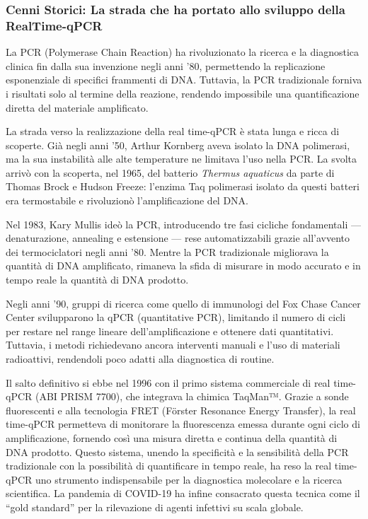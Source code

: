 \begin{noSplitBlock}
\subsubsection{Cenni Storici: La strada che ha portato allo sviluppo della RealTime-qPCR}
\footnotesize{
  La PCR (Polymerase Chain Reaction) ha rivoluzionato la ricerca e la diagnostica clinica fin dalla sua invenzione negli anni ’80, permettendo la replicazione esponenziale di specifici frammenti di DNA. Tuttavia, la PCR tradizionale forniva i risultati solo al termine della reazione, rendendo impossibile una quantificazione diretta del materiale amplificato.

La strada verso la realizzazione della real time-qPCR è stata lunga e ricca di scoperte. Già negli anni ’50, Arthur Kornberg aveva isolato la DNA polimerasi, ma la sua instabilità alle alte temperature ne limitava l’uso nella PCR. La svolta arrivò con la scoperta, nel 1965, del batterio \emph{Thermus aquaticus} da parte di Thomas Brock e Hudson Freeze: l’enzima Taq polimerasi isolato da questi batteri era termostabile e rivoluzionò l’amplificazione del DNA.

Nel 1983, Kary Mullis ideò la PCR, introducendo tre fasi cicliche fondamentali — denaturazione, annealing e estensione — rese automatizzabili grazie all’avvento dei termociclatori negli anni ’80. Mentre la PCR tradizionale migliorava la quantità di DNA amplificato, rimaneva la sfida di misurare in modo accurato e in tempo reale la quantità di DNA prodotto.

Negli anni ’90, gruppi di ricerca come quello di immunologi del Fox Chase Cancer Center svilupparono la qPCR (quantitative PCR), limitando il numero di cicli per restare nel range lineare dell’amplificazione e ottenere dati quantitativi. Tuttavia, i metodi richiedevano ancora interventi manuali e l’uso di materiali radioattivi, rendendoli poco adatti alla diagnostica di routine.

Il salto definitivo si ebbe nel 1996 con il primo sistema commerciale di real time-qPCR (ABI PRISM 7700), che integrava la chimica TaqMan™. Grazie a sonde fluorescenti e alla tecnologia FRET (Förster Resonance Energy Transfer), la real time-qPCR permetteva di monitorare la fluorescenza emessa durante ogni ciclo di amplificazione, fornendo così una misura diretta e continua della quantità di DNA prodotto. Questo sistema, unendo la specificità e la sensibilità della PCR tradizionale con la possibilità di quantificare in tempo reale, ha reso la real time-qPCR uno strumento indispensabile per la diagnostica molecolare e la ricerca scientifica. La pandemia di COVID-19 ha infine consacrato questa tecnica come il “gold standard” per la rilevazione di agenti infettivi su scala globale.
}
\end{noSplitBlock}

